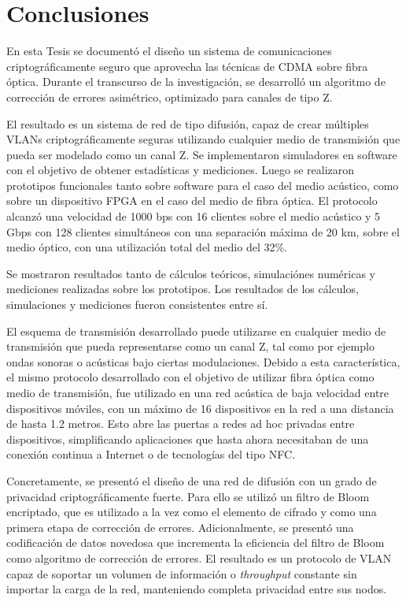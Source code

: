 \chapter{Conclusiones}

En esta Tesis se documentó el diseño un sistema de comunicaciones criptográficamente seguro que aprovecha las técnicas de CDMA sobre fibra óptica. Durante el transcurso de la investigación, se desarrolló un algoritmo de corrección de errores asimétrico, optimizado para canales de tipo Z.

El resultado es un sistema de red de tipo difusión, capaz de crear múltiples VLANs criptográficamente seguras utilizando cualquier medio de transmisión que pueda ser modelado como un canal Z. 
Se implementaron simuladores en software con el objetivo de obtener estadísticas y mediciones. Luego se realizaron prototipos funcionales tanto sobre software para el caso del medio acústico, como sobre un dispositivo FPGA en el caso del medio de fibra óptica. El protocolo alcanzó una velocidad de 1000 bps con 16 clientes sobre el medio acústico y 5 Gbps con 128 clientes simultáneos con una separación máxima de 20 km, sobre el medio óptico, con una utilización total del medio del 32\%.

Se mostraron resultados tanto de cálculos teóricos, simulaciónes numéricas y mediciones realizadas sobre los prototipos. Los resultados de los cálculos, simulaciones y mediciones fueron consistentes entre sí.

El esquema de transmisión desarrollado puede utilizarse en cualquier medio de transmisión que pueda representarse como un canal Z, tal como por ejemplo ondas sonoras o acústicas bajo ciertas modulaciones. Debido a esta característica, el mismo protocolo desarrollado con el objetivo de utilizar fibra óptica como medio de transmisión, fue utilizado en una red acústica de baja velocidad entre dispositivos móviles, con un máximo de 16 dispositivos en la red a una distancia de hasta 1.2 metros. Esto abre las puertas a redes ad hoc privadas entre dispositivos, simplificando aplicaciones que hasta ahora necesitaban de una conexión continua a Internet o de tecnologías del tipo NFC.

Concretamente, se presentó el diseño de una red de difusión con un grado de privacidad criptográficamente fuerte. Para ello se utilizó un filtro de Bloom \cite{Bloom70space/timetrade-offs} encriptado, que es utilizado a la vez como el elemento de cifrado y como una primera etapa de corrección de errores. Adicionalmente, se presentó una codificación de datos novedosa\cite{6476559} que incrementa la eficiencia del filtro de Bloom como algoritmo de corrección de errores. El resultado es un protocolo de VLAN capaz de soportar un volumen de información o \textit{throughput} constante sin importar la carga de la red, manteniendo completa privacidad entre sus nodos.

